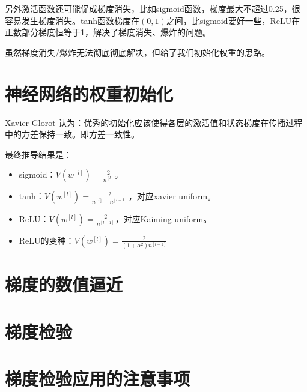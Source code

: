 \documentclass[../../main.tex]{subfiles}
\begin{document}
另外激活函数还可能促成梯度消失，比如sigmoid函数，梯度最大不超过0.25，很容易发生梯度消失。tanh函数梯度在\((0, 1)\)之间，比sigmoid要好一些，ReLU在正数部分梯度恒等于1，解决了梯度消失、爆炸的问题。

虽然梯度消失/爆炸无法彻底彻底解决，但给了我们初始化权重的思路。


\section{神经网络的权重初始化}
Xavier Glorot 认为：优秀的初始化应该使得各层的激活值和状态梯度在传播过程中的方差保持一致。即方差一致性。

最终推导结果是：
\begin{itemize}
    \item sigmoid：\(V(w^{[l]}) = \frac{2}{n^{[l]}}\)。
    \item tanh：\(V(w^{[l]}) = \frac{2}{n^{[l]} + n^{[l-1]}}\)，对应xavier uniform。
    \item ReLU：\(V(w^{[l]}) = \frac{2}{n^{[l-1]}}\)，对应Kaiming uniform。
    \item ReLU的变种：\(V(w^{[l]}) = \frac{2}{(1 + α^2)n^{[l-1]}}\)
\end{itemize}

\section{梯度的数值逼近}

\section{梯度检验}

\section{梯度检验应用的注意事项}
\end{document}

